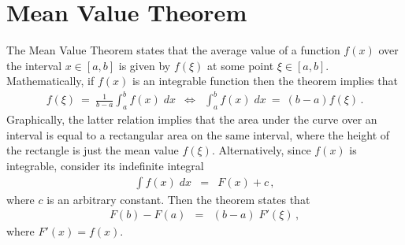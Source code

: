 \documentclass[a4paper]{book}
\begin{document}
\section{Mean Value Theorem}
\label{sec:mean-value-theorem}
The Mean Value Theorem states that the average value of a function
$f(x)$ over the interval $x\in[a,b]$ is given by $f(\xi)$ at some
point $\xi\in[a,b]$.
Mathematically, if $f(x)$ is an integrable function
then the theorem implies that
\begin{eqnarray*}
f(\xi)~=~\frac{1}{b-a}\int_{a}^{b}f(x)\;dx
& \Leftrightarrow &
\int_{a}^{b}f(x)\;dx~=~(b-a)f(\xi)\,.
\end{eqnarray*}
Graphically, the latter relation implies that
the area under the curve over an interval
is equal to a rectangular area on the same interval,
where the height of the rectangle is just the mean value $f(\xi)$.
Alternatively, since $f(x)$ is integrable, consider its indefinite
integral
\begin{eqnarray*}
\int f(x)\;dx & = & F(x)+c\,,
\end{eqnarray*}
where $c$ is an arbitrary constant.
Then the theorem states that
\begin{eqnarray*}
F(b)-F(a) & = & (b-a)\;F'(\xi)\,,
\end{eqnarray*}
where $F'(x)=f(x)$.

\end{document}
